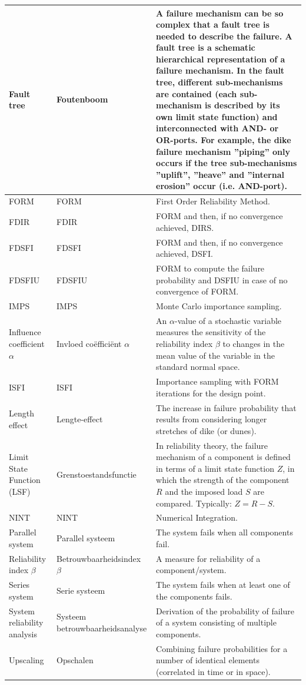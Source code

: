 {\begin{longtable}{L{3cm} L{3.5cm} J{7cm}}
\hline
Fault tree & Foutenboom & A failure mechanism can be so complex that a fault tree is needed to describe the failure. A fault tree is a schematic hierarchical representation of a failure mechanism. In the fault tree, different sub-mechanisms are contained (each sub-mechanism is described by its own limit state function) and interconnected with AND- or OR-ports.  For example, the dike failure mechanism ''piping'' only occurs if the tree sub-mechanisms ''uplift'', ''heave'' and ''internal erosion'' occur (i.e. AND-port).\\
\hline
FORM & FORM & First Order Reliability Method.\\
\hline
FDIR & FDIR & FORM and then, if no convergence achieved, DIRS.\\
\hline
FDSFI & FDSFI & FORM and then, if no convergence achieved, DSFI.\\
\hline
FDSFIU & FDSFIU & FORM to compute the failure probability and DSFIU in case of no convergence of FORM.\\
\hline
IMPS & IMPS & Monte Carlo importance sampling.\\
\hline
Influence coefficient $\alpha$ & Invloed coëfficiënt $\alpha$ & An $\alpha$-value of a stochastic variable measures the sensitivity of the reliability index $\beta$ to changes in the mean value of the variable in the standard normal space.\\
\hline
ISFI & ISFI & Importance sampling with FORM iterations for the design point.\\
\hline
Length effect & Lengte-effect & The increase in failure probability that results from considering longer stretches of dike (or dunes).\\
\hline
Limit State Function (LSF) & Grenstoestandsfunctie  & In reliability theory, the failure mechanism of a component is defined in terms of a limit state function $Z$, in which the strength of the component $R$ and the imposed load $S$ are compared. Typically: $Z=R-S$.\\
\hline
NINT & NINT & Numerical Integration.\\
\hline
Parallel system & Parallel systeem & The system fails when all components fail.\\
\hline
Reliability index $\beta$ & Betrouwbaarheidsindex $\beta$ &  A measure for reliability of a component/system.\\
\hline
Series system & Serie systeem & The system fails when at least one of the components fails.\\
\hline
System reliability analysis & Systeem betrouwbaarheidsanalyse & Derivation of the probability of failure of a system consisting of multiple components.\\
\hline
Upscaling & Opschalen & Combining failure probabilities for a number of identical elements (correlated in time or in space).\\
\hline
\end{longtable}
}
